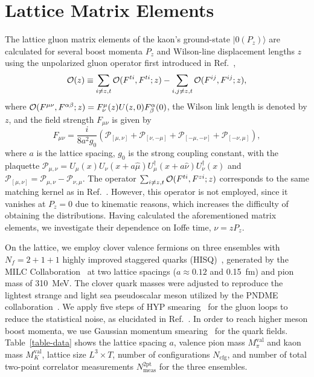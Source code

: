 \section{Lattice Matrix Elements}\label{sec:lattice-details}

The lattice gluon matrix elements of the kaon's ground-state  $|0 (P_z) \rangle$  are calculated for several boost momenta $P_z$ and Wilson-line displacement lengths $z$ using the unpolarized gluon operator first introduced in Ref.~\cite{Balitsky:2019krf},
%
\begin{equation}\label{eq:gluon_operator}
 {\cal O}(z)\equiv\sum_{i\neq z,t}{\cal O}(F^{ti},F^{ti};z)-\sum_{i,j\neq z,t}{\cal O}(F^{ij},F^{ij};z),
\end{equation}
%
where ${\cal O}(F^{\mu\nu}, F^{\alpha\beta};z) = F^\mu_\nu(z)U(z,0)F^\alpha_\beta(0)$, the Wilson link length is denoted by $z$, and the field strength $F_{\mu\nu}$ is given by
%
\begin{equation}\label{field_strength}
 F_{\mu\nu} = \frac{i}{8a^2g_0}\left(\mathcal{P}_{[\mu,\nu]}+\mathcal{P}_{[\nu,-\mu]}+\mathcal{P}_{[-\mu,-\nu]}+\mathcal{P}_{[-\nu,\mu]}\right),
\end{equation}
%
where $a$ is the lattice spacing, $g_0$ is the strong coupling constant, with the plaquette $\mathcal{P_{\mu,\nu}}=U_\mu(x)U_\nu(x+a\hat{\mu})U^\dag_\mu(x+a\hat{\nu})U^\dag_\nu(x)$ and $\mathcal{P_{[\mu,\nu]}}=\mathcal{P}_{\mu,\nu}-\mathcal{P}_{\nu,\mu}$.
The operator $\sum_{i\neq z,t}{\cal O}(F^{ti},F^{zi};z)$ corresponds to the same matching kernel as in Ref.~\cite{Balitsky:2019krf}.
However, this operator is not employed, since it vanishes at $P_z=0$ due to kinematic reasons, which increases the difficulty of obtaining the distributions.
Having calculated the aforementioned matrix elements, we investigate their dependence on Ioffe time, $\nu=zP_z$.

On the lattice, we employ clover valence fermions on three ensembles with $N_f=2+1+1$ highly improved staggered quarks (HISQ)~\cite{Follana:2006rc}, generated by the MILC Collaboration~\cite{MILC:2010pul,Bazavov:2012xda} at two lattice spacings ($a\approx 0.12$ and 0.15~fm) and pion mass of 310~MeV.
The clover quark masses were adjusted to reproduce the lightest strange and light sea pseudoscalar meson utilized by the PNDME collaboration~\cite{Rajan:2017lxk,Bhattacharya:2015wna,Bhattacharya:2015esa,Bhattacharya:2013ehc}.
We apply five steps of HYP smearing~\cite{Hasenfratz:2001hp} for the gluon loops to reduce the statistical noise, as elucidated in Ref.~\cite{Fan:2018dxu}.
In order to reach higher meson boost momenta, we use Gaussian momentum smearing~\cite{Bali:2016lva} for the quark fields.
Table~\ref{table-data} shows the lattice spacing $a$, valence pion mass $M_\pi^\text{val}$ and kaon mass $M_K^\text{val}$, lattice size $L^3\times T$, number of configurations $N_\text{cfg}$, and number of total two-point correlator measurements $N_\text{meas}^\text{2pt}$
for the three ensembles.


